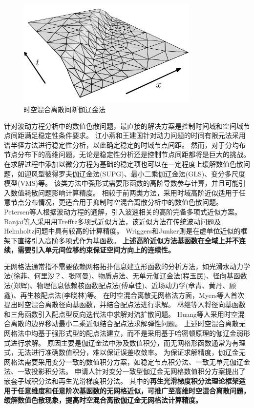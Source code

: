 \begin{figure}[!h]
    \centering 
    \includegraphics[width=0.8\textwidth]{figures/wave.png}
    \caption{时空混合离散间断伽辽金法}
    \label{fg:slab}
\end{figure}

针对波动方程分析中的数值色散问题，最直接的解决方案是控制时间域和空间域节点间距满足稳定性条件要求\cite{bajer1986}。
江小燕和王建国\cite{JiangXiaoYan2014}针对动力问题的时间有限元法采用谱半径方法进行稳定性分析，以此确定稳定的时域节点间距。
然而，对于分均布节点分布下的高维问题，无论是稳定性分析还是控制节点间距都将是巨大的挑战。
在求解过程中添加以微分方程为基础的稳定项也可以在一定程度上缓解数值色散问题，如迎风型彼得罗夫伽辽金法(SUPG)\cite{hughes1988}、最小二乘伽辽金法(GLS)\cite{hughes2000}、变分多尺度模型(VMS)\cite{hughes1996}等。
该类方法中强形式需要形函数的高阶导数参与计算，并且可能引入数值耗散问题影响计算精度。
相较于前两类方法，采用时域高阶近似适用于任意节点分布情况，更适合用于抑制时空混合离散分析中的数值色散问题。
Petersen等人\cite{petersen2000}根据波动方程的通解，引入波速相关的高阶完备多项式近似方案。
Banjai等人\cite{banjai2017}采用用Trefftz多项式近似方法，该近似方法在传统波动问题及Helmholtz问题中具有较高的计算精度。
Wriggers和Junker\cite{wriggers2024}则是在虚单位近似的框架下直接引入高阶多项式作为基函数。
\textbf{上述高阶近似方法基函数在全域上并不连续，需要引入单元间位移约束保证空间方向上的连续性。}

无网格法通常指不需要依赖网格拓扑信息建立形函数的分析方法，如光滑水动力学法(徐菲、何里沙？、张阿曼)、物质点法、无单元伽辽金法(程玉民)、径向基函数法(郑辉)、物理信息依赖核函数配点法(傅卓佳)、近场动力学(章青、黄丹、顾鑫)、再生核配点法(李晓林)等。
在时空混合离散无网格法方面，Myers等人\cite{myers}首次提出时空混合离散径向基函数，并结合配点法进行求解。
林继等人\cite{lin}将径向基函数和三角函数引入配点型反向迭代法中求解对流扩散问题。
Huang等人\cite{huang}采用时空混合离散的边界移动最小二乘近似结合配点法求解弹性问题。
上述时空混合离散无网格法中均基于强形式型的配点法建立，而不是采用基于哈密顿原理的伽辽金弱形式进行求解。
原因主要是伽辽金法中涉及数值积分，而无网格形函数通常为有理式，无法进行准确数值积分，难以保证误差收敛率\cite{wu2021}。
为保证求解精度，伽辽金无网格法需要采用变分一致的数值积分方案\cite{Wu2016d}，如稳定节点积分法、一致无单元伽辽金法、一致投影积分法。
申请人针对变分一致型伽辽金无网格数值积分方案提出了嵌套子域积分法\cite{wang2016b}和再生光滑梯度积分法\cite{wang2019a}。
其中的\textbf{再生光滑梯度积分法理论框架适用于任意维度和任意阶次基函数的无网格近似，可推广至高维时空混合离散问题，缓解数值色散现象，提高时空混合离散伽辽金无网格法计算精度。}

